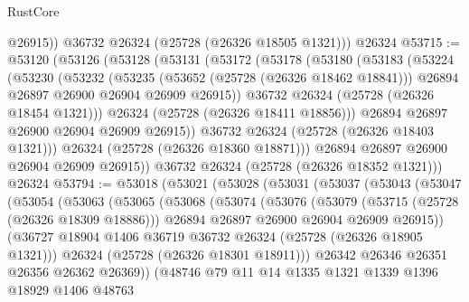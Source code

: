 \begin{lexlean}{RustCore}
\begin{coremodule}
          @26915))
      @36732
      @26324
      (@25728 (@26326 @18505 @1321)))
    @26324
@53715 := @53120
    (@53126
      (@53128
        (@53131
          (@53172
            (@53178
              (@53180
                (@53183
                  (@53224
                    (@53230
                      (@53232
                        (@53235
                          (@53652 (@25728 (@26326 @18462 @18841)))
                          @26894
                          @26897
                          @26900
                          @26904
                          @26909
                          @26915))
                      @36732
                      @26324
                      (@25728 (@26326 @18454 @1321)))
                    @26324
                    (@25728 (@26326 @18411 @18856)))
                  @26894
                  @26897
                  @26900
                  @26904
                  @26909
                  @26915))
              @36732
              @26324
              (@25728 (@26326 @18403 @1321)))
            @26324
            (@25728 (@26326 @18360 @18871)))
          @26894
          @26897
          @26900
          @26904
          @26909
          @26915))
      @36732
      @26324
      (@25728 (@26326 @18352 @1321)))
    @26324
@53794 := @53018
    (@53021
      (@53028
        (@53031
          (@53037
            (@53043
              (@53047
                (@53054
                  (@53063
                    (@53065
                      (@53068
                        (@53074
                          (@53076
                            (@53079
                              (@53715 (@25728 (@26326 @18309 @18886)))
                              @26894
                              @26897
                              @26900
                              @26904
                              @26909
                              @26915))
                          (@36727 @18904 @1406 @36719 @36732 @26324 (@25728 (@26326 @18905 @1321)))
                          @26324
                          (@25728 (@26326 @18301 @18911)))
                        @26342
                        @26346
                        @26351
                        @26356
                        @26362
                        @26369))
                    (@48746
                      @79
                      @11
                      @14
                      @1335
                      @1321
                      @1339
                      @1396
                      @18929
                      @1406
                      @48763

\end{coremodule}
\end{lexlean}
